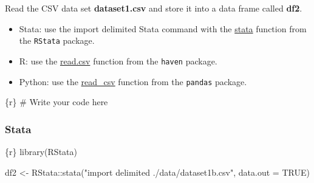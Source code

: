 \documentclass[
  letterpaper,
  DIV=11,
  numbers=noendperiod,
  oneside]{scrreprt}
\newenvironment{Shaded}{\begin{snugshade}}{\end{snugshade}}
\newcommand{\AttributeTok}[1]{\textcolor[rgb]{0.40,0.45,0.13}{#1}}
\newcommand{\CommentTok}[1]{\textcolor[rgb]{0.37,0.37,0.37}{#1}}
\newcommand{\ConstantTok}[1]{\textcolor[rgb]{0.56,0.35,0.01}{#1}}
\newcommand{\FunctionTok}[1]{\textcolor[rgb]{0.28,0.35,0.67}{#1}}
\newcommand{\InformationTok}[1]{\textcolor[rgb]{0.37,0.37,0.37}{#1}}
\newcommand{\NormalTok}[1]{\textcolor[rgb]{0.00,0.23,0.31}{#1}}
\newcommand{\OtherTok}[1]{\textcolor[rgb]{0.00,0.23,0.31}{#1}}
\newcommand{\SpecialCharTok}[1]{\textcolor[rgb]{0.37,0.37,0.37}{#1}}
\newcommand{\StringTok}[1]{\textcolor[rgb]{0.13,0.47,0.30}{#1}}
\providecommand{\tightlist}{%
  \setlength{\itemsep}{0pt}\setlength{\parskip}{0pt}}\usepackage{longtable,booktabs,array}
\begin{document}
Read the CSV data set \textbf{dataset1.csv} and store it into a data
frame called \textbf{df2}.

\begin{tcolorbox}[enhanced jigsaw, coltitle=black, opacityback=0, title=\textcolor{quarto-callout-tip-color}{\faLightbulb}\hspace{0.5em}{Tip}, toprule=.15mm, bottomtitle=1mm, colbacktitle=quarto-callout-tip-color!10!white, colframe=quarto-callout-tip-color-frame, left=2mm, opacitybacktitle=0.6, bottomrule=.15mm, arc=.35mm, toptitle=1mm, colback=white, titlerule=0mm, breakable, leftrule=.75mm, rightrule=.15mm]

\begin{itemize}
\tightlist
\item
  Stata: use the import delimited Stata command with the
  \href{https://rdrr.io/github/lbraglia/RStata/man/stata.html}{stata}
  function from the \texttt{RStata} package.
\item
  R: use the
  \href{https://www.rdocumentation.org/packages/utils/versions/3.6.2/topics/read.table}{read.csv}
  function from the \texttt{haven} package.
\item
  Python: use the
  \href{https://pandas.pydata.org/docs/reference/api/pandas.read_csv.html}{read\_csv}
  function from the \texttt{pandas} package.
\end{itemize}

\end{tcolorbox}

\begin{Shaded}
\begin{Highlighting}[]
\InformationTok{\textasciigrave{}\textasciigrave{}\textasciigrave{}\{r\}}
\CommentTok{\# Write your code here}
\InformationTok{\textasciigrave{}\textasciigrave{}\textasciigrave{}}
\end{Highlighting}
\end{Shaded}

\subsubsection{Stata}

\begin{Shaded}
\begin{Highlighting}[]
\InformationTok{\textasciigrave{}\textasciigrave{}\textasciigrave{}\{r\}}
\FunctionTok{library}\NormalTok{(RStata)}

\NormalTok{df2 }\OtherTok{\textless{}{-}}\NormalTok{ RStata}\SpecialCharTok{::}\FunctionTok{stata}\NormalTok{(}\StringTok{"import delimited ./data/dataset1b.csv"}\NormalTok{,}
                     \AttributeTok{data.out =} \ConstantTok{TRUE}\NormalTok{)}
\InformationTok{\textasciigrave{}\textasciigrave{}\textasciigrave{}}
\end{Highlighting}
\end{Shaded}
\end{document}
